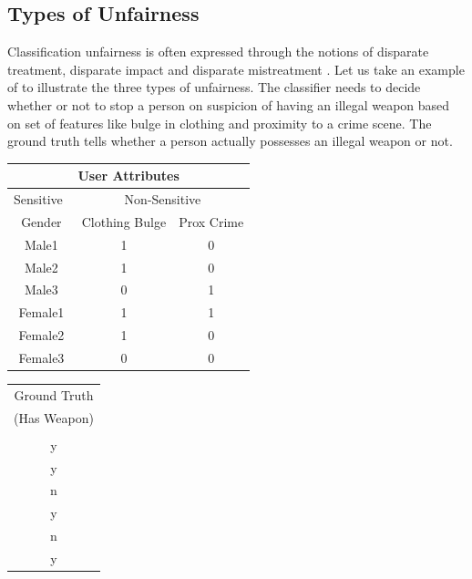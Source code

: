 \documentclass[runningheads]{llncs}
\begin{document}
\subsection{Types of Unfairness}
Classification unfairness is often expressed through the notions of disparate treatment, disparate impact and disparate mistreatment \cite{zafar2015fairness}. Let us take an example of \cite{zafar2017fairness} to illustrate the three types of unfairness. The classifier needs to decide whether or not to stop a person on suspicion of having an illegal weapon based on set of features like bulge in clothing and proximity to a crime scene. The ground truth tells whether a person actually possesses an illegal weapon or not. 
\begin{table}[!htbp]
    \begin{minipage}{.40\linewidth}
      \centering
\begin{tabular}{|c|c|c|}
\hline 
\multicolumn{3}{|c|}{User Attributes}\\
\hline
Sensitive\ & \multicolumn{2}{c}{Non-Sensitive} \vline \\
\hline
Gender   & Clothing Bulge    & Prox Crime\\
\hline
Male1   &  1 & 0\\
\hline
Male2   &  1 & 0\\
\hline
Male3   &  0 & 1\\
\hline
Female1   &  1 & 1\\
\hline
Female2   &  1 & 0\\
\hline
Female3   &  0 & 0\\
\hline
\end{tabular}
\end{minipage}%
    \begin{minipage}{.40\linewidth}
      \centering
        \begin{tabular}{|c|}
        \hline
Ground Truth \\
(Has Weapon) \\
\\
\hline
y\\
\hline
y\\
\hline
n\\
\hline
y\\
\hline
n\\
\hline
y\\
\hline
\end{tabular}
\end{minipage}%
    \begin{minipage}{.20\linewidth}
      \centering
        \begin{tabular}{|c|c|c|}

\end{tabular}
\end{minipage}
\end{table}
\end{document}
